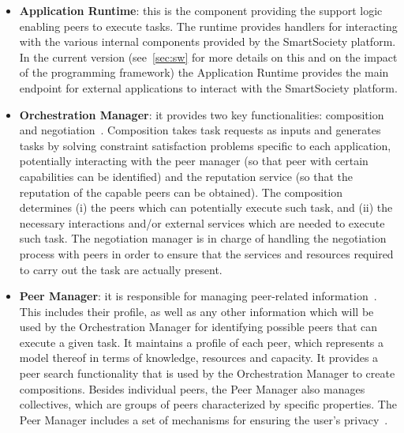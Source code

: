 \begin{itemize}
\item \textbf{Application Runtime}: this is the component providing the support logic enabling peers to execute tasks. The runtime provides handlers for interacting with the various internal components provided by the SmartSociety platform. In the current version (see~\ref{sec:sw} for more details on this and on the impact of the programming framework) the Application Runtime provides the main endpoint for external applications to interact with the SmartSociety platform. %

\item \textbf{Orchestration Manager}: it provides two key functionalities: composition and negotiation~\cite{D6.2}. Composition takes task requests as inputs and generates tasks by solving constraint satisfaction problems specific to each application, potentially interacting with the peer manager (so that peer with certain capabilities can be identified) and the reputation service (so that the reputation of the capable peers can be obtained). The composition determines (i) the peers which can potentially execute such task, and (ii) the necessary interactions and/or external services which are needed to execute such task.  The negotiation manager is in charge of handling the negotiation process with peers in order to ensure that the services and resources required to carry out the task are actually present. %

\item \textbf{Peer Manager}: it is responsible for managing peer-related information~\cite{D4.3}. This includes their profile, as well as any other information which will be used by the Orchestration Manager for identifying possible peers that can execute a given task.  It maintains a profile of each peer, which
represents a model thereof in terms of knowledge, resources and
capacity. It provides a peer search functionality that is used by the Orchestration Manager to create compositions. Besides individual peers, the Peer Manager also manages collectives, which are groups of peers characterized by specific properties. %
The Peer Manager includes a set of mechanisms for ensuring the user's privacy~\cite{D4.3}.


\end{itemize}
